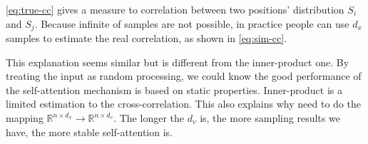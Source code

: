 \documentclass[final]{cvpr}
\begin{document}
\autoref{eq:true-cc} gives a measure to correlation between two positions' distribution $S_i$ and $S_j$. Because infinite of samples are not possible, in practice people can use $d_x$ samples to estimate the real correlation, as shown in \autoref{eq:sim-cc}.

This explanation seems similar but is different from the inner-product one. By treating the input as random processing, we could know the good performance of the self-attention mechanism is based on static properties. Inner-product is a limited estimation to the cross-correlation. This also explains why need to do the mapping $\mathbb{R}^{n\times d_x} \to \mathbb{R}^{n\times d_v}$. The longer the $d_v$ is, the more sampling results we have, the more stable self-attention is.

{\small


}
\end{document}

